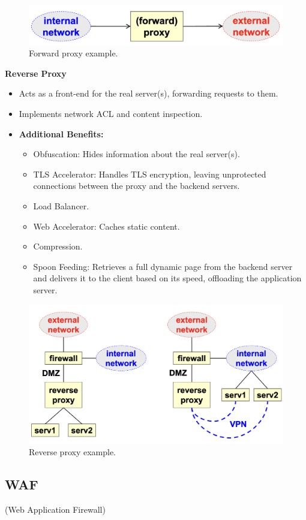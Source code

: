 \begin{figure}[H]
    \centering
    \includegraphics[width=0.5\linewidth]{Images/Firewalling/forward_proxy.png}
    \caption{Forward proxy example.}
\end{figure}
    
\begin{center}
    \textbf{Reverse Proxy}
\end{center} 

\begin{itemize}
    \item Acts as a front-end for the real server(s), forwarding requests to them.
    \item Implements network ACL and content inspection.
    \item \textbf{Additional Benefits:}
    \begin{itemize}
        \item Obfuscation: Hides information about the real server(s).
        \item TLS Accelerator: Handles TLS encryption, leaving unprotected connections between the proxy and the backend servers.
        \item Load Balancer.
        \item Web Accelerator: Caches static content.
        \item Compression.
        \item Spoon Feeding: Retrieves a full dynamic page from the backend server and delivers it to the client based on its speed, offloading the application server.
    \end{itemize}
\end{itemize}

\begin{figure}[H]
    \centering
    \includegraphics[width=0.5\linewidth]{Images/Firewalling/reverse_proxy.png}
    \caption{Reverse proxy example.}
\end{figure}

\subsection{WAF}
\begin{center}
(Web Application Firewall)
\end{center}

